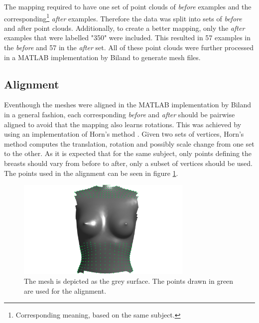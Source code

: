 The mapping required to have one set of point clouds of \textit{before} examples and the corresponding\footnote{Corresponding meaning, based on the same subject.} \textit{after} examples. Therefore the data was split into sets of \textit{before} and after point clouds. Additionally, to create a better mapping, only the \textit{after} examples that were labelled "350" were included. This resulted in 57 examples in the \textit{before} and 57 in the \textit{after} set. All of these point clouds were further processed in a MATLAB implementation by Biland \cite{Biland17} to generate mesh files.

\subsection{Alignment}
Eventhough the meshes were aligned in the MATLAB implementation by Biland \cite{Biland17} in a general fashion, each corresponding \textit{before} and \textit{after} should be pairwise aligned to avoid that the mapping also learns rotations. This was achieved by using an implementation of Horn's method \cite{horn1987closed}. Given two sets of vertices, Horn's method computes the translation, rotation and possibly scale change from one set to the other. As it is expected that for the same subject, only points defining the breasts should vary from before to after, only a subset of vertices should be used. The points used in the alignment can be seen in figure \ref{fig:alignment}.

\begin{figure}[h]
\centering
\includegraphics[width=0.75\textwidth]{figures/alignment}
\caption{The mesh is depicted as the grey surface. The points drawn in green are used for the alignment.}
\label{fig:alignment}
\end{figure}

